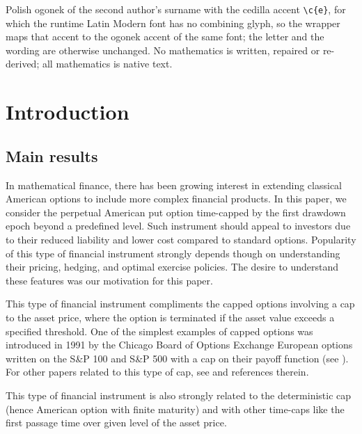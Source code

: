 \documentclass[10pt,a4paper]{amsart}
\begin{document}
Polish ogonek of the second author's surname with the cedilla accent \texttt{\textbackslash c\{e\}}, for which the runtime Latin Modern font has no combining glyph, so the wrapper maps that accent to the ogonek accent of the same font; the letter and the wording are otherwise unchanged. No mathematics is written, repaired or re-derived; all mathematics is native text.
	\section{Introduction}
	\subsection{Main results}
	
	
	In mathematical finance, there has been growing interest in extending classical American options to include more complex financial products.
	In this paper, we consider the perpetual American put option time-capped by the first drawdown epoch beyond a predefined level.
	Such instrument should appeal to investors due to their reduced liability and lower cost compared to standard options. Popularity of this type of financial instrument strongly depends though on
	understanding their pricing, hedging, and optimal exercise policies. The desire to understand these features was our motivation for this paper.
	
	This type of financial instrument compliments the capped options involving a cap to the asset price, where the option is terminated if the asset value exceeds a specified threshold.
	One of the simplest examples of capped options was introduced in 1991 by the Chicago Board of Options Exchange European options written on the S\&P 100 and S\&P 500 with a cap on their payoff function (see \cite{cap}).
	For other papers related to this type of cap, see \cite{Zaevski2, Zaevski2b} and references therein.
	
	This type of financial instrument is also strongly related to the deterministic cap (hence American option with finite maturity) and
	with other time-caps like the first passage time over given level of the asset price.
	
\end{document}

